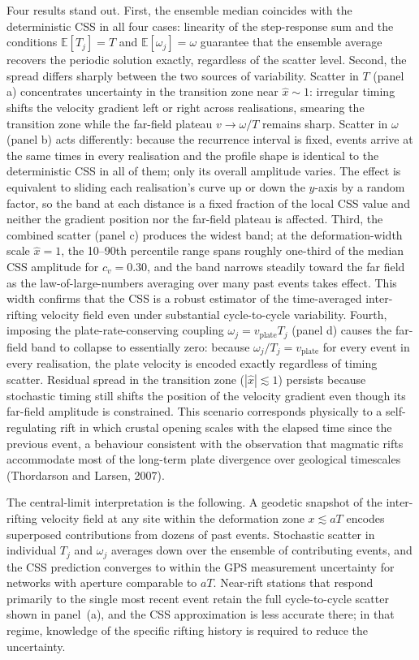 \documentclass[12pt]{article}
\begin{document}
Four results stand out.  First, the ensemble median coincides with the
deterministic CSS in all four cases: linearity of the step-response sum and
the conditions $\mathbb{E}[T_j] = T$ and $\mathbb{E}[\omega_j] = \omega$
guarantee that the ensemble average recovers the periodic solution exactly,
regardless of the scatter level.  Second, the spread differs sharply between
the two sources of variability.  Scatter in $T$ (panel a) concentrates
uncertainty in the transition zone near $\hat{x}\sim 1$: irregular timing
shifts the velocity gradient left or right across realisations, smearing the
transition zone while the far-field plateau $v \to \omega/T$ remains sharp.
Scatter in $\omega$ (panel b) acts differently: because the recurrence
interval is fixed, events arrive at the same times in every realisation and
the profile shape is identical to the deterministic CSS in all of them;
only its overall amplitude varies.  The effect is equivalent to sliding each
realisation's curve up or down the $y$-axis by a random factor, so the band
at each distance is a fixed fraction of the local CSS value and neither the
gradient position nor the far-field plateau is affected.  Third, the combined scatter
(panel c) produces the widest band; at the deformation-width scale
$\hat{x} = 1$, the 10--90th percentile range spans roughly one-third of the
median CSS amplitude for $c_v = 0.30$, and the band narrows steadily toward
the far field as the law-of-large-numbers averaging over many past events
takes effect.  This width confirms that the CSS is a robust estimator of the
time-averaged inter-rifting velocity field even under substantial cycle-to-cycle
variability.  Fourth, imposing the plate-rate-conserving coupling
$\omega_j = v_{\mathrm{plate}} T_j$ (panel d) causes the far-field band to
collapse to essentially zero: because $\omega_j/T_j = v_{\mathrm{plate}}$
for every event in every realisation, the plate velocity is encoded exactly
regardless of timing scatter.  Residual spread in the transition zone
($|\hat{x}| \lesssim 1$) persists because stochastic timing still shifts
the position of the velocity gradient even though its far-field amplitude is
constrained.  This scenario corresponds physically to a self-regulating rift
in which crustal opening scales with the elapsed time since the previous
event, a behaviour consistent with the observation that magmatic rifts
accommodate most of the long-term plate divergence over geological timescales
(Thordarson and Larsen, 2007).

The central-limit interpretation is the following.  A geodetic snapshot of
the inter-rifting velocity field at any site within the deformation zone
$x \lesssim aT$ encodes superposed contributions from dozens of past events.
Stochastic scatter in individual $T_j$ and $\omega_j$ averages down over
the ensemble of contributing events, and the CSS prediction converges to
within the GPS measurement uncertainty for networks with aperture comparable
to $aT$.  Near-rift stations that respond primarily to the single most recent
event retain the full cycle-to-cycle scatter shown in panel~(a), and the CSS
approximation is less accurate there; in that regime, knowledge of the specific
rifting history is required to reduce the uncertainty.
\end{document}
